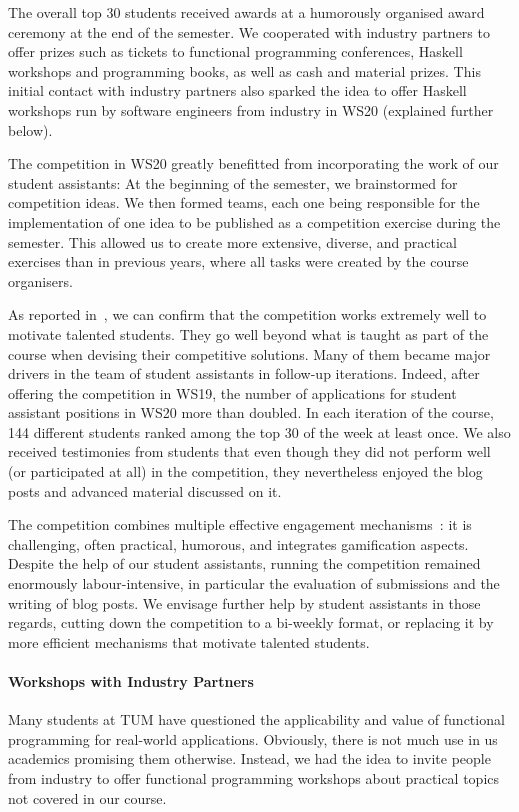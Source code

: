 The overall top 30 students received awards at
a humorously organised award ceremony at the end of the semester.
We cooperated with industry partners
to offer prizes such as tickets to functional programming conferences,
Haskell workshops and programming books, as well as cash and material prizes.
This initial contact with industry partners
also sparked the idea to offer Haskell workshops
run by software engineers from industry in WS20 (explained further below).

The competition in WS20 greatly benefitted from incorporating the work of our student assistants:
At the beginning of the semester,
we brainstormed for competition ideas.
We then formed teams, each one being responsible for the
implementation of one idea to be published as a competition exercise during the semester.
This allowed us to create more extensive, diverse,
and practical exercises than in previous years,
where all tasks were created by the course organisers.

As reported in~\cite{next_1100},
we can confirm that the competition works extremely well to motivate talented students.
They go well beyond what is taught as part of the course when devising their competitive solutions.
Many of them became major drivers in
the team of student assistants in follow-up iterations.
Indeed, after offering the competition in WS19,
the number of applications for student assistant positions in WS20 more than doubled.
In each iteration of the course, 144 different students ranked among the top 30 of the week at least once.
We also received testimonies from students that even though they did not perform well (or participated at all) in the competition,
they nevertheless enjoyed the blog posts and advanced material discussed on it.

The competition combines multiple
effective engagement mechanisms~\cite{onlineengagement5,engagementproposals}:
it is challenging, often practical, humorous,
and integrates gamification aspects.
Despite the help of our student assistants,
running the competition remained enormously labour-intensive,
in particular the evaluation of submissions and
the writing of blog posts.
We envisage further help by student assistants in those regards,
cutting down the competition to a bi-weekly format,
or replacing it by more efficient mechanisms that motivate talented students.

\paragraph{Workshops with Industry Partners}
Many students at TUM have questioned the applicability and value of functional programming for real-world applications.
Obviously, there is not much use in us academics promising
them otherwise.
Instead, we had the idea to invite people from industry
to offer functional programming workshops about
practical topics not covered in our course.


